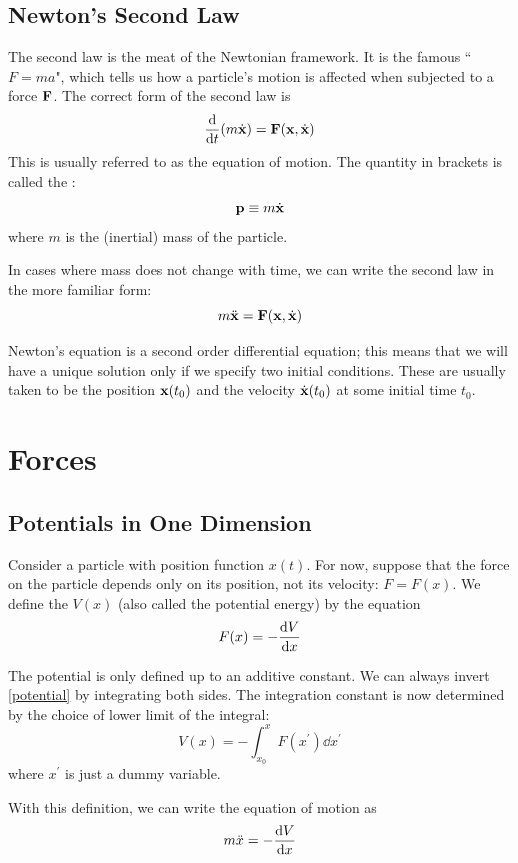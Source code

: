 \section{Newton's Second Law}
The second law is the meat of the Newtonian framework. It is the famous ``$F=ma$", which tells us how a particle's motion is affected when subjected to a force $\vb{F}$. The
correct form of the second law is
\begin{equation}
\odv*{(m\dot{\vb{x}})}{t} = \vb{F}(\vb{x},\dot{\vb{x}})
\end{equation}
This is usually referred to as the equation of motion. The quantity in brackets is called the :
\[ \vb{p} \equiv m\dot{\vb{x}} \]
where $m$ is the (inertial) mass of the particle.

In cases where mass does not change with time, we can write the second law in the more familiar form:
\begin{equation}
m\ddot{\vb{x}} = \vb{F}(\vb{x},\dot{\vb{x}})
\end{equation}

Newton's equation is a second order differential equation; this means that we will have a unique solution only if we specify two initial conditions. These are usually taken to be the position $\vb{x}(t_0)$ and the velocity $\dot{\vb{x}}(t_0)$ at some initial time $t_0$.

\chapter{Forces}
\section{Potentials in One Dimension}
Consider a particle with position function $x(t)$. For now, suppose that the force on the particle depends only on its position, not its velocity: $F=F(x)$. We define the  $V(x)$ (also called the potential energy) by the equation
\begin{equation}\label{potential}
F(x) = -\dv{V}{x}
\end{equation}

The potential is only defined up to an additive constant. We can always invert \cref{potential} by integrating both sides. The integration constant is now determined by the choice of lower limit of the integral:
\[ V(x) = -\int_{x_0}^x F(x^\prime) \dd{x^\prime} \]
where $x^\prime$ is just a dummy variable.

With this definition, we can write the equation of motion as
\begin{equation}\label{conservative}
m\ddot{x} = -\dv{V}{x}
\end{equation}

